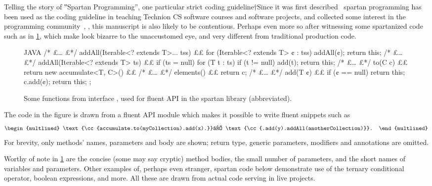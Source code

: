 Telling the story of ‟Spartan Programming”, one particular strict coding
guideline†{Since it was first described~\cite{TOOLS:98:Santa:Barbara}
  spartan programming has been used as the coding guideline in teaching
  Technion CS software courses and software projects, and collected some interest
  in the programming community~\cite{Coding:Horror:Spartan}}, \Java, this
  manuscript is also likely to be contentious. Perhaps even more so after
witnessing some spartanized code such as in \cref{figure:accumulate}, which
make look bizarre to the unaccustomed eye, and very different from
traditional production \Java code.

\begin{figure}
\caption{\label{figure:accumulate}
  Some functions from interface ,
  used for fluent API in the spartan library (abbreviated).
  }
    \centering
\begin{code}[minipage,width=\columnwidth]{JAVA}
/* £… £*/ addAll(Iterable<? extends T>... tss) {££
  for (Iterable<? extends T> ¢ : tss)
    addAll(¢);
  return this;
}
/* £… £*/ addAll(Iterable<? extends T> ts) {££
  if (ts = null)
    for (T t : ts)
      if (t != null)
        add(t);
  return this;
}
/* £… £*/ to(C c) {££
  return new accumulate<T, C>() {££
    /* £… £*/ elements() {££
        return c;
    }
    /* £… £*/ add(T ¢) {££
        if (¢ == null)
          return this;
        c.add(¢);
        return this;
    }
  };
}
\end{code}
\end{figure}

The code in the figure is drawn from a fluent API module which makes it possible to write fluent snippets
such as \[
  \begin{multlined}
    \text{\cc{accumulate.to(myCollection).add(x).}}⏎
    \text{\cc{.add(y).addAll(anotherCollection)}}.
  \end{multlined}
\]
For brevity, only methods' names, parameters and body are shown;
return type, generic parameters, modifiers and annotations are omitted.

Worthy of note in \cref{figure:accumulate} are the concise (some may say
cryptic) method bodies, the small number of parameters, and the short names of
variables and parameters. Other examples of, perhaps even stranger, spartan
code below demonstrate use of the ternary conditional operator, boolean
expressions, and more. All these are drawn from actual code serving in live
projects.

